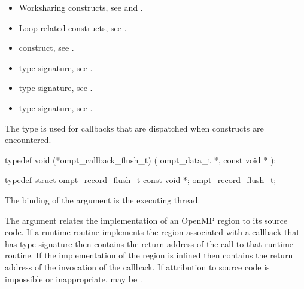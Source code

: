 \crossreferences
\begin{itemize}
\item Worksharing constructs, see  and 
.

\item Loop-related constructs, see .

\item {} construct, see .

\item {} type signature, see
.

\item {} type signature, see
.

\item {} type signature, see
.
\end{itemize}



\label{sec:ompt_callback_flush_t}
\summary
The  type is used for callbacks that are
dispatched when  constructs are encountered.

\format
\begin{ccppspecific}
\begin{omptCallback}
typedef void (*ompt_callback_flush_t) (
  ompt_data_t *,
  const void *
);
\end{omptCallback}
\end{ccppspecific}

\record
\begin{ccppspecific}
\begin{omptRecord}
typedef struct ompt_record_flush_t {
  const void *;
} ompt_record_flush_t;
\end{omptRecord}
\end{ccppspecific}

\argdesc
The binding of the  argument is the executing thread.

The  argument relates the implementation of an OpenMP region
to its source code. If a runtime routine implements the region associated with
a callback that has type signature  then
 contains the return address of the call to that runtime routine.
If the implementation of the region is inlined then  contains the
return address of the invocation of the callback. If attribution to source code
is impossible or inappropriate, may be .

